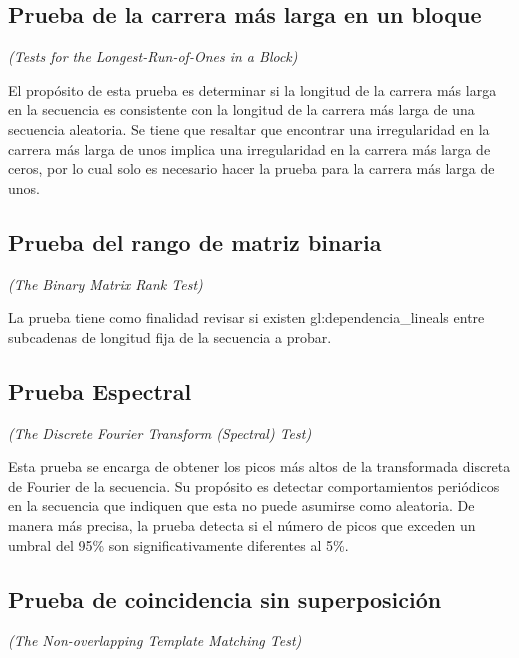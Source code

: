 

\subsection{Prueba de la carrera más larga en un bloque} %
\textit{(Tests for the Longest-Run-of-Ones in a Block)}

El propósito de esta prueba es determinar si la longitud de la carrera más
larga en la secuencia es consistente con la longitud de la carrera más larga
de una secuencia aleatoria. Se tiene que resaltar que encontrar una
irregularidad en la carrera más larga de unos implica una irregularidad en
la carrera más larga de ceros, por lo cual solo es necesario hacer la prueba
para la carrera más larga de unos.

\subsection{Prueba del rango de matriz binaria} %
\textit{(The Binary Matrix Rank Test)}

La prueba tiene como finalidad revisar si existen \glspl{gl:dependencia_lineal}
entre subcadenas de longitud fija de la secuencia a probar.

\subsection{Prueba Espectral} %
\textit{(The Discrete Fourier Transform (Spectral) Test)}

Esta prueba se encarga de obtener los picos más altos de la transformada
discreta de Fourier de la secuencia. Su propósito es detectar comportamientos
periódicos en la secuencia que indiquen que esta no puede asumirse como
aleatoria. De manera más precisa, la prueba detecta si el número de picos que
exceden un umbral del 95\% son significativamente diferentes al 5\%.

\subsection{Prueba de coincidencia sin superposición} %
\textit{(The Non-overlapping Template Matching Test)}

